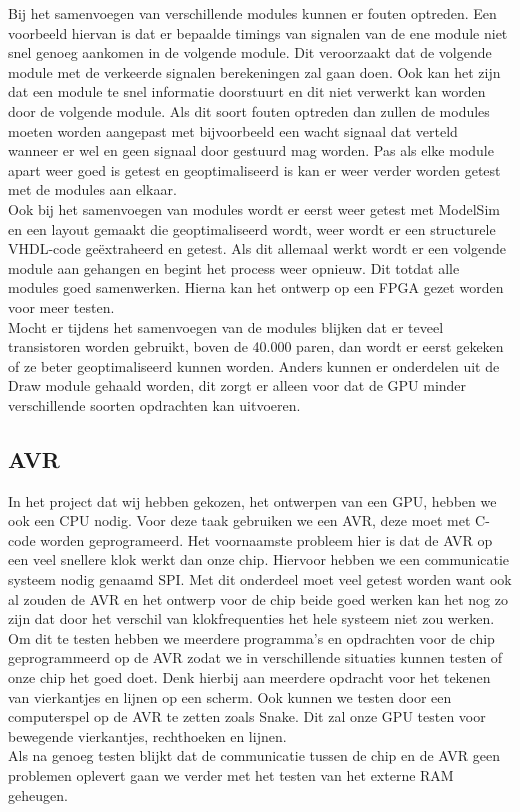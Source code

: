\documentclass{scrartcl} %
\begin{document}
Bij het samenvoegen van verschillende modules kunnen er fouten optreden. Een voorbeeld hiervan is dat er bepaalde timings van signalen van de ene module niet snel genoeg aankomen in de volgende module.
Dit veroorzaakt dat de volgende module met de verkeerde signalen berekeningen zal gaan doen. Ook kan het zijn dat een module te snel informatie doorstuurt en dit niet verwerkt kan worden door de volgende module.
Als dit soort fouten optreden dan zullen de modules moeten worden aangepast met bijvoorbeeld een wacht signaal dat verteld wanneer er wel en geen signaal door gestuurd mag worden. Pas als elke module apart weer goed is getest 
en geoptimaliseerd is kan er weer verder worden getest met de modules aan elkaar.\\
Ook bij het samenvoegen van modules wordt er eerst weer getest met ModelSim en een layout gemaakt die geoptimaliseerd wordt, weer wordt er een structurele VHDL-code geëxtraheerd en getest. Als dit allemaal werkt wordt er een volgende 
module aan gehangen en begint het process weer opnieuw. Dit totdat alle modules goed samenwerken. Hierna kan het ontwerp op een FPGA gezet worden voor meer testen.\\
Mocht er tijdens het samenvoegen van de modules blijken dat er teveel transistoren worden gebruikt, boven de 40.000 paren, dan wordt er eerst gekeken of ze beter geoptimaliseerd kunnen worden. Anders kunnen er onderdelen uit de Draw module gehaald worden,
 dit zorgt er alleen voor dat de GPU minder verschillende soorten opdrachten kan uitvoeren.


\subsection{AVR}

In het project dat wij hebben gekozen, het ontwerpen van een GPU, hebben we ook een CPU nodig. Voor deze taak gebruiken we een AVR, deze moet met C-code worden geprogrameerd. Het voornaamste probleem hier is dat 
de AVR op een veel snellere klok werkt dan onze chip. Hiervoor hebben we een communicatie systeem nodig genaamd SPI. Met dit onderdeel moet veel getest worden want ook al zouden de AVR en het ontwerp voor de chip beide goed werken 
kan het nog zo zijn dat door het verschil van klokfrequenties het hele systeem niet zou werken.\\
Om dit te testen hebben we meerdere programma's en opdrachten voor de chip geprogrammeerd op de AVR zodat we in verschillende situaties kunnen testen of onze chip het goed doet. Denk hierbij aan meerdere opdracht voor het tekenen van vierkantjes
en lijnen op een scherm. Ook kunnen we testen door een computerspel op de AVR te zetten zoals Snake. Dit zal onze GPU testen voor bewegende vierkantjes, rechthoeken en lijnen.\\
Als na genoeg testen blijkt dat de communicatie tussen de chip en de AVR geen problemen oplevert gaan we verder met het testen van het externe RAM geheugen.
\end{document}
